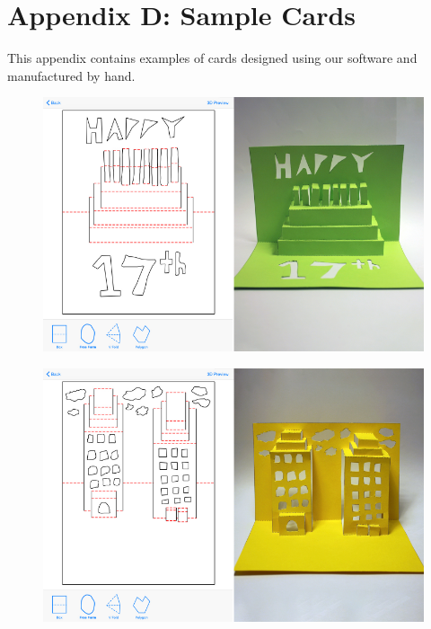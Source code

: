 \section{Appendix D: Sample Cards}\label{appendix-d-sample-cards}

This appendix contains examples of cards designed using our software and
manufactured by hand.

\begin{figure}[htbp]
\centering
\includegraphics{figures/93_Appendix_Sample_Cards/bday_combined.pdf}
\caption{}
\end{figure}

\begin{figure}[htbp]
\centering
\includegraphics{figures/93_Appendix_Sample_Cards/city_combined.pdf}
\caption{}
\end{figure}

